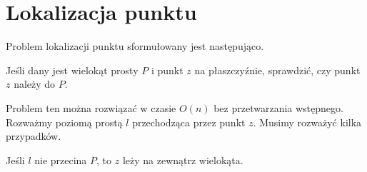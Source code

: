 \newcommand{\convexA}{
  \coordinate (p0) at (4.5,2);
  \coordinate (p1) at (4,3.25);
  \coordinate (p2) at (2,4);
  \coordinate (p3) at (1,3.5);
  \coordinate (p4) at (0,2);
  \coordinate (p5) at (2,0);
  \coordinate (p6) at (3.75,1);

  \draw (p0) -- (p1) -- (p2) -- (p3) -- (p4) -- (p5) -- (p6) -- cycle;
}

\newcommand{\convexB}{
  \coordinate (p0) at (3.5,     4);
  \coordinate (p1) at (1.5,     4.5);
  \coordinate (p2) at (0,       3.5);
  \coordinate (p3) at (-0.5,    1.5);
  \coordinate (p4) at (1.75,    0);
  \coordinate (p5) at (4,       1);

  \draw (p0) -- (p1) -- (p2) -- (p3) -- (p4) -- (p5) -- cycle;
}

\chapter{Lokalizacja punktu\label{chap:point_location}}
Problem lokalizacji punktu sformułowany jest następująco.

\begin{problem}
  Jeśli dany jest wielokąt prosty $P$ i punkt $z$ na płaszczyźnie,
  sprawdzić, czy punkt $z$ należy do $P$.
\end{problem}

Problem ten można rozwiązać w czasie $O(n)$ bez przetwarzania
wstępnego. Rozważmy poziomą prostą $l$ przechodząca przez punkt
$z$. Musimy rozważyć kilka przypadków.

Jeśli $l$ nie przecina $P$, to $z$ leży na zewnątrz wielokąta.
\begin{figure}[htp]
  \centering
  \caption{}
\end{figure}

